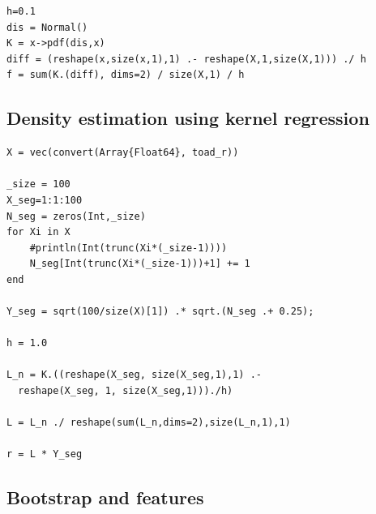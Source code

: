 \documentclass{article}
\begin{document}
\begin{lstlisting}
h=0.1
dis = Normal()
K = x->pdf(dis,x)
diff = (reshape(x,size(x,1),1) .- reshape(X,1,size(X,1))) ./ h
f = sum(K.(diff), dims=2) / size(X,1) / h
\end{lstlisting}

\subsection{Density estimation using kernel regression}

\begin{lstlisting}
X = vec(convert(Array{Float64}, toad_r))

_size = 100
X_seg=1:1:100
N_seg = zeros(Int,_size)
for Xi in X
    #println(Int(trunc(Xi*(_size-1))))
    N_seg[Int(trunc(Xi*(_size-1)))+1] += 1
end

Y_seg = sqrt(100/size(X)[1]) .* sqrt.(N_seg .+ 0.25);

h = 1.0

L_n = K.((reshape(X_seg, size(X_seg,1),1) .- 
  reshape(X_seg, 1, size(X_seg,1)))./h)

L = L_n ./ reshape(sum(L_n,dims=2),size(L_n,1),1)

r = L * Y_seg

\end{lstlisting}

\subsection{Bootstrap and features}
\end{document}
